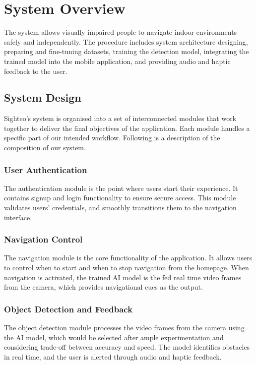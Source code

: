 \documentclass{FastFyp}
\begin{document}
\section{System Overview}
The system allows visually impaired people to navigate indoor environments safely and independently. The procedure includes system architecture designing, preparing and fine-tuning datasets, training the detection model, integrating the trained model into the mobile application, and providing audio and haptic feedback to the user.

\subsection{System Design}
Sighteo's system is organised into a set of interconnected modules that work together to deliver the final objectives of the application. Each module handles a specific part of our intended workflow. Following is a description of the composition of our system.

\subsubsection{User Authentication}
The authentication module is the point where users start their experience. It contains signup and login functionality to ensure secure access. This module validates users' credentials, and smoothly transitions them to the navigation interface.

\subsubsection{Navigation Control}
The navigation module is the core functionality of the application. It allows users to control when to start and when to stop navigation from the homepage. When navigation is activated, the trained AI model is the fed real time video frames from the camera, which provides navigational cues as the output.

\subsubsection{Object Detection and Feedback}
The object detection module processes the video frames from the camera using the AI model, which would be selected after ample experimentation and considering trade-off between accuracy and speed. The model identifies obstacles in real time, and the user is alerted through audio and haptic feedback.
\end{document}
